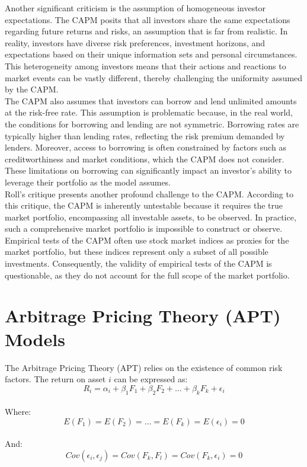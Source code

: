 \documentclass[a4paper,10pt]{article}
\begin{document}
\noindent Another significant criticism is the assumption of homogeneous investor expectations. The CAPM posits that all investors share the same expectations regarding future returns and risks, an assumption that is far from realistic. In reality, investors have diverse risk preferences, investment horizons, and expectations based on their unique information sets and personal circumstances. This heterogeneity among investors means that their actions and reactions to market events can be vastly different, thereby challenging the uniformity assumed by the CAPM. \\

\noindent The CAPM also assumes that investors can borrow and lend unlimited amounts at the risk-free rate. This assumption is problematic because, in the real world, the conditions for borrowing and lending are not symmetric. Borrowing rates are typically higher than lending rates, reflecting the risk premium demanded by lenders. Moreover, access to borrowing is often constrained by factors such as creditworthiness and market conditions, which the CAPM does not consider. These limitations on borrowing can significantly impact an investor's ability to leverage their portfolio as the model assumes. \\

\noindent Roll's critique presents another profound challenge to the CAPM. According to this critique, the CAPM is inherently untestable because it requires the true market portfolio, encompassing all investable assets, to be observed. In practice, such a comprehensive market portfolio is impossible to construct or observe. Empirical tests of the CAPM often use stock market indices as proxies for the market portfolio, but these indices represent only a subset of all possible investments. Consequently, the validity of empirical tests of the CAPM is questionable, as they do not account for the full scope of the market portfolio. \\

\section*{Arbitrage Pricing Theory (APT) Models}

\noindent The Arbitrage Pricing Theory (APT) relies on the existence of common risk factors. The return on asset \(i\) can be expressed as: \\
\[R_i = \alpha_i + \beta_1 F_1 + \beta_2 F_2 + \ldots + \beta_k F_k + \epsilon_i\] \\
\noindent Where: \\
\[E(F_1) = E(F_2) = \ldots = E(F_k) = E(\epsilon_i) = 0\] \\
\noindent And: \\
\[Cov(\epsilon_i, \epsilon_j) = Cov(F_k, F_l) = Cov(F_k, \epsilon_i) = 0\] \\
\end{document}
